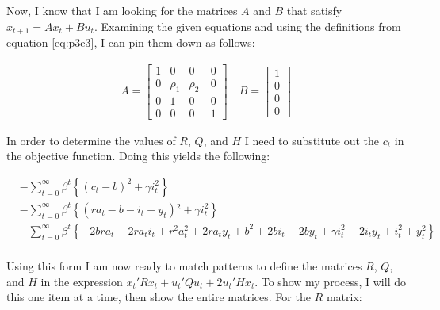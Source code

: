 \begin{homeworkProblem}[Problem 5.3]
{\begin{enumerate}[a.]
        Now, I know that I am looking for the matrices $A$ and $B$ that satisfy $x_{t+1} = A x_t + B u_t$. Examining the given equations and using the definitions from equation \ref{eq:p3e3}, I can pin them down as follows:

        \begin{align} \label{eq:p3e4}
          A =
          \begin{bmatrix}
            1 & 0 & 0 & 0 \\
            0 & \rho_1 & \rho_2\ & 0  \\
            0 & 1 & 0 & 0 \\
            0 & 0 & 0 & 1
          \end{bmatrix}
          \quad
          B =
          \begin{bmatrix}
            1\\
            0\\
            0\\
            0
          \end{bmatrix}
        \end{align}

        In order to determine the values of $R$, $Q$, and $H$ I need to substitute out the $c_t$ in the objective function. Doing this yields the following:

        \begin{align} \label{eq:p3e5}
          & - \sum_{t=0}^{\infty} \beta^t \left\{ (c_t - b)^2 + \gamma i_t^2 \right \} \\
          & - \sum_{t=0}^{\infty} \beta^t \left\{ \left(r a_t-b-i_t+y_t\right){}^2+\gamma  i_t^2 \right \} \\
          & - \sum_{t=0}^{\infty} \beta^t \left\{ -2 b r a_t-2 r a_t i_t+r^2 a_t^2+2 r a_t y_t+b^2+2 b i_t-2 b y_t+\gamma  i_t^2-2 i_t y_t+i_t^2+y_t^2 \right\} \\
        \end{align}

        Using this form I am now ready to match patterns to define the matrices $R$, $Q$, and $H$ in the expression $x_t' R x_t + u_t'Qu_t + 2 u_t' H x_t $. To show my process, I will do this one item at a time, then show the entire matrices. For the $R$ matrix:


\end{enumerate}}
\end{homeworkProblem}
